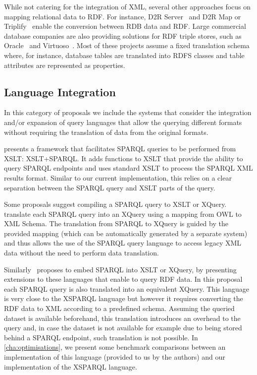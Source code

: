 While not catering for the integration of \ac{XML}, several other approaches focus on mapping relational data to
\ac{RDF}.
%
For instance, D2R Server~\cite{Bizer:2003aa} and D2R Map or Triplify~\cite{AuerDietzoldLehmann:2009aa} enable the
conversion between RDB data and \ac{RDF}.
%
Large commercial database companies are also providing solutions for \ac{RDF} triple stores, such as
Oracle~\cite{DasSrinivasan:2009aa} and Virtuoso~\cite{ErlingMikhailov:2007aa}.  Most of these projects assume a fixed
translation schema where, for instance, database tables are translated into \ac{RDFS} classes and table attributes are
represented as properties.



\subsection*{Language Integration}
\label{sec:language-integration}
%
In this category of proposals we include the systems that consider the integration and/or expansion of query languages
that allow the querying different formats without requiring the translation of data from the original formats.

\citet{BerruetaLabraHerman:2008aa} presents a framework that facilitates SPARQL queries to be performed from \ac{XSLT}:
XSLT+SPARQL.  It adds functions to \ac{XSLT} that provide the ability to query SPARQL endpoints and uses standard
\ac{XSLT} to process the SPARQL \ac{XML} results format.
%
Similar to our current implementation, this relies on a clear separation between the SPARQL query and \ac{XSLT} parts of the
query.



Some proposals suggest compiling a SPARQL query to \ac{XSLT} or XQuery. \citet{BikakisGioldasisTsinaraki:2009aa}
translate each SPARQL query into an XQuery using a mapping from \ac{OWL} to \ac{XML} Schema.  The translation from
SPARQL to XQuery is guided by the provided mapping (which can be automatically generated by a separate system) and thus
allows the use of the SPARQL query language to access legacy \ac{XML} data without the need to perform data translation.

Similarly~\citet{GroppeGroppeLinnemann:2008aa} proposes to embed SPARQL into \ac{XSLT} or XQuery, by presenting
extensions to these languages that enable to query \ac{RDF} data.  In this proposal each SPARQL query is also translated
into an equivalent XQuery.
%
This language is very close to the XSPARQL language but however it requires converting the \ac{RDF} data to \ac{XML}
according to a predefined schema.
%
Assuming the queried dataset is available beforehand, this translation introduces an overhead to the query and, in case
the dataset is not available for example due to being stored behind a SPARQL endpoint, such translation is not possible.
%
In \cref{cha:optimisations}, we present some benchmark comparisons between an implementation of this language
(provided to us by the authors) and our implementation of the XSPARQL language.

